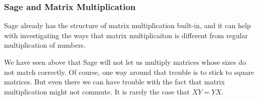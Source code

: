 \documentclass[10pt,]{book}
\theoremstyle{plain}
\numberwithin{equation}{section}
\begin{document}
\subsubsection[Sage and Matrix Multiplication]{Sage and Matrix Multiplication}\label{subsubsection-18}

        Sage already has the structure of matrix multiplication built-in, and
        it can help with investigating the ways that matrix multiplicaiton
        is different from regular multiplication of numbers.
\par

        We have seen above
        that Sage will not let us multiply matrices whose sizes do not match
        correctly.  Of course, one way around that trouble is to stick to square
        matrices. But even there we can have trouble with the fact that matrix
        multiplication might not commute. It is rarely the case that \(XY = YX\).
\par
\end{document}
